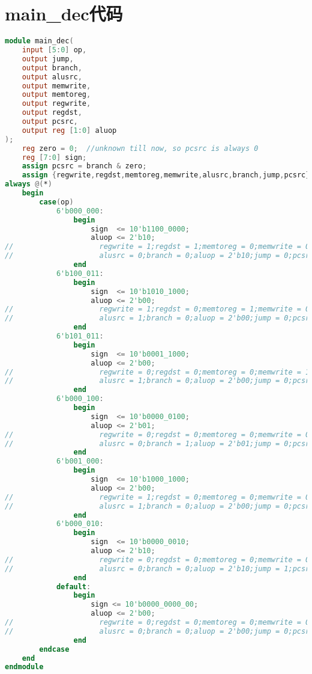 \section{main\_dec代码}
\begin{lstlisting}[language=Verilog]
    module main_dec(
    input [5:0] op,
    output jump,
    output branch,
    output alusrc,
    output memwrite,
    output memtoreg,
    output regwrite,
    output regdst,
    output pcsrc,
    output reg [1:0] aluop
);
    reg zero = 0;  //unknown till now, so pcsrc is always 0
    reg [7:0] sign;
    assign pcsrc = branch & zero;
    assign {regwrite,regdst,memtoreg,memwrite,alusrc,branch,jump,pcsrc} = sign;
always @(*)
    begin
        case(op)
            6'b000_000:
                begin
                    sign  <= 10'b1100_0000;
                    aluop <= 2'b10;
//                    regwrite = 1;regdst = 1;memtoreg = 0;memwrite = 0;
//                    alusrc = 0;branch = 0;aluop = 2'b10;jump = 0;pcsrc = branch&unknown;
                end
            6'b100_011:
                begin
                    sign  <= 10'b1010_1000;
                    aluop <= 2'b00;
//                    regwrite = 1;regdst = 0;memtoreg = 1;memwrite = 0;
//                    alusrc = 1;branch = 0;aluop = 2'b00;jump = 0;pcsrc = branch&unknown;
                end
            6'b101_011:
                begin
                    sign  <= 10'b0001_1000;
                    aluop <= 2'b00;
//                    regwrite = 0;regdst = 0;memtoreg = 0;memwrite = 1;
//                    alusrc = 1;branch = 0;aluop = 2'b00;jump = 0;pcsrc = branch&unknown;
                end
            6'b000_100:
                begin
                    sign  <= 10'b0000_0100;
                    aluop <= 2'b01;
//                    regwrite = 0;regdst = 0;memtoreg = 0;memwrite = 0;
//                    alusrc = 0;branch = 1;aluop = 2'b01;jump = 0;pcsrc = branch&unknown;
                end
            6'b001_000:
                begin
                    sign  <= 10'b1000_1000;
                    aluop <= 2'b00;
//                    regwrite = 1;regdst = 0;memtoreg = 0;memwrite = 0;
//                    alusrc = 1;branch = 0;aluop = 2'b00;jump = 0;pcsrc = branch&unknown;
                end
            6'b000_010:
                begin
                    sign  <= 10'b0000_0010;
                    aluop <= 2'b10;
//                    regwrite = 0;regdst = 0;memtoreg = 0;memwrite = 0;
//                    alusrc = 0;branch = 0;aluop = 2'b10;jump = 1;pcsrc = branch&unknown;
                end
            default:
                begin
                    sign <= 10'b0000_0000_00;
                    aluop <= 2'b00;
//                    regwrite = 0;regdst = 0;memtoreg = 0;memwrite = 0;
//                    alusrc = 0;branch = 0;aluop = 2'b00;jump = 0;pcsrc = branch&unknown;
                end
        endcase
    end
endmodule
\end{lstlisting}

